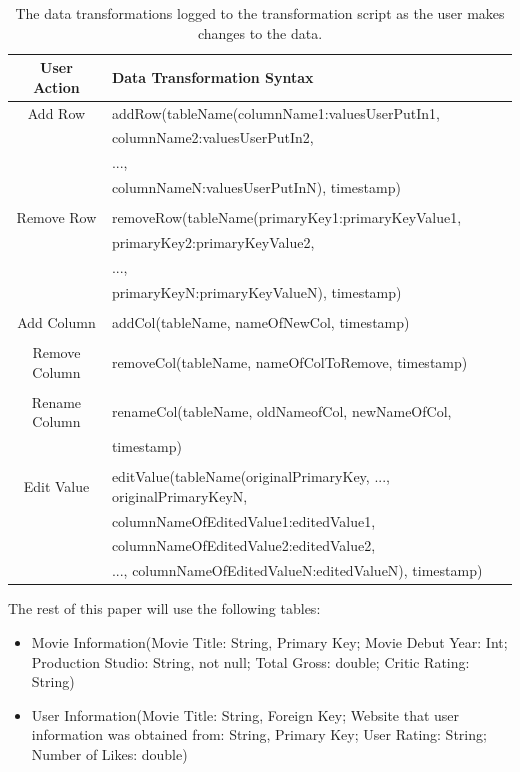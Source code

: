 \documentclass[12pt]{article}
\begin{document}
\begin{table}[!ht]
\centering
\begin{tabular}{ | c | l | }
 \hline
    User Action & Data Transformation Syntax \\ \hline \hline
    Add Row & addRow(tableName(columnName1:valuesUserPutIn1,\\ & columnName2:valuesUserPutIn2, \\ & ..., \\ & columnNameN:valuesUserPutInN),  timestamp)\\ & \\ \hline
    Remove Row & removeRow(tableName(primaryKey1:primaryKeyValue1,\\ & primaryKey2:primaryKeyValue2, \\ & ..., \\ & primaryKeyN:primaryKeyValueN),  timestamp)\\ & \\ \hline
    Add Column & addCol(tableName, nameOfNewCol, timestamp)\\ & \\ \hline
    Remove Column & removeCol(tableName, nameOfColToRemove, timestamp)\\ & \\ \hline
    Rename Column & renameCol(tableName, oldNameofCol, newNameOfCol, \\ & timestamp)\\ & \\ \hline
    Edit Value & editValue(tableName(originalPrimaryKey, ..., originalPrimaryKeyN,\\ & columnNameOfEditedValue1:editedValue1, \\ & columnNameOfEditedValue2:editedValue2, \\ & ..., columnNameOfEditedValueN:editedValueN),  timestamp)\\ 
    \hline
\end{tabular}
\caption{The data transformations logged to the transformation script as the user makes changes to the data.}
\label{table:transformations_summary}
\end{table}

\noindent The rest of this paper will use the following tables:
\begin{itemize}
\item {Movie Information(Movie Title: String, Primary Key; Movie Debut Year: Int; Production Studio: String, not null; Total Gross: double; Critic Rating: String)}
\item{User Information(Movie Title: String, Foreign Key; Website that user information was obtained from: String, Primary Key; User Rating: String; Number of Likes: double)}
\end{itemize}
\end{document}
